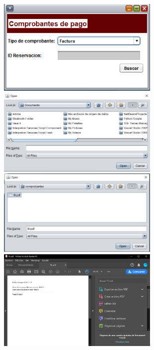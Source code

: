 \documentclass[12pt]{article}
\begin{document}
\begin{flushleft}
\begin{center}
\includegraphics[width=7.75cm]{comprobante1.png}
\includegraphics[width=7.75cm]{comprobante2.png}
\includegraphics[width=7.75cm]{comprobante3.png}
\includegraphics[width=7.75cm]{comprobante4.png}
\end{center}



\end{flushleft}
\end{document}
